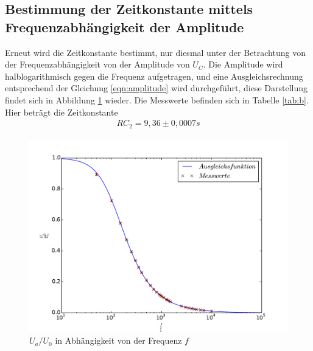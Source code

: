 \subsection{Bestimmung der Zeitkonstante mittels Frequenzabhängigkeit der Amplitude }
Erneut wird die Zeitkonstante bestimmt, nur diesmal unter
der Betrachtung von der Frequenzabhängigkeit von der Amplitude von $U_C$.
Die Amplitude wird halblogarithmisch gegen die Frequenz aufgetragen, und eine Ausgleichsrechnung
entsprechend der Gleichung \eqref{eqn:amplitude} wird durchgeführt,
diese Darstellung findet sich in Abbildung \ref{abb:b} wieder.
Die Messwerte befinden sich in Tabelle \ref{tab:b}.
Hier beträgt die Zeitkonstante
\begin{align*}
RC_\mathrm{2}=9,36 \pm 0,0007s
\end{align*}
\begin{figure}[h]
  \centering
  \includegraphics[width=1\textwidth]{b.pdf}
  \caption{$U_a/U_0$ in Abhängigkeit von der Frequenz $f$}
  \label{abb:b}
\end{figure}
